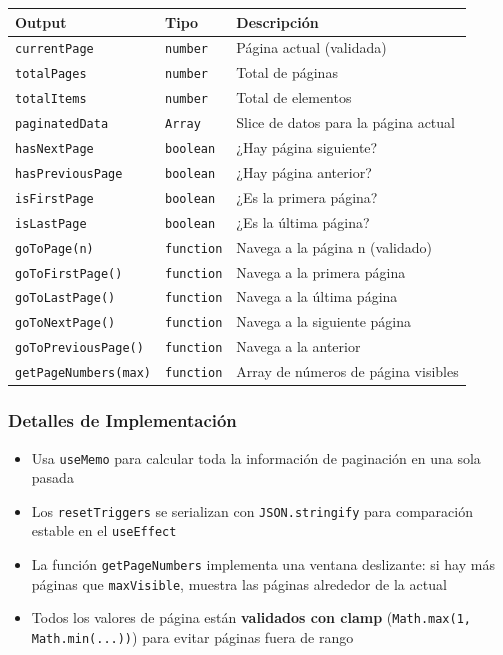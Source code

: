 \documentclass[12pt,a4paper]{article}
\begin{document}
\begin{table}[h]
\centering
\begin{tabular}{lll}
\toprule
\textbf{Output} & \textbf{Tipo} & \textbf{Descripción} \\
\midrule
\texttt{currentPage} & \texttt{number} & Página actual (validada) \\
\texttt{totalPages} & \texttt{number} & Total de páginas \\
\texttt{totalItems} & \texttt{number} & Total de elementos \\
\texttt{paginatedData} & \texttt{Array} & Slice de datos para la página actual \\
\texttt{hasNextPage} & \texttt{boolean} & ¿Hay página siguiente? \\
\texttt{hasPreviousPage} & \texttt{boolean} & ¿Hay página anterior? \\
\texttt{isFirstPage} & \texttt{boolean} & ¿Es la primera página? \\
\texttt{isLastPage} & \texttt{boolean} & ¿Es la última página? \\
\texttt{goToPage(n)} & \texttt{function} & Navega a la página n (validado) \\
\texttt{goToFirstPage()} & \texttt{function} & Navega a la primera página \\
\texttt{goToLastPage()} & \texttt{function} & Navega a la última página \\
\texttt{goToNextPage()} & \texttt{function} & Navega a la siguiente página \\
\texttt{goToPreviousPage()} & \texttt{function} & Navega a la anterior \\
\texttt{getPageNumbers(max)} & \texttt{function} & Array de números de página visibles \\
\bottomrule
\end{tabular}
\end{table}

\subsubsection{Detalles de Implementación}

\begin{itemize}
  \item Usa \texttt{useMemo} para calcular toda la información de paginación en una sola pasada
  \item Los \texttt{resetTriggers} se serializan con \texttt{JSON.stringify} para comparación estable en el \texttt{useEffect}
  \item La función \texttt{getPageNumbers} implementa una ventana deslizante: si hay más páginas que \texttt{maxVisible}, muestra las páginas alrededor de la actual
  \item Todos los valores de página están \textbf{validados con clamp} (\texttt{Math.max(1, Math.min(...))}) para evitar páginas fuera de rango
\end{itemize}
\end{document}

